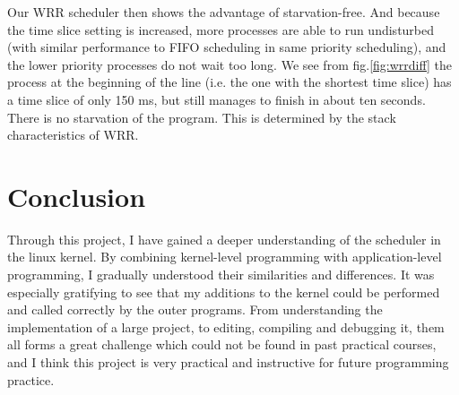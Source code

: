 \documentclass[11pt]{article}
\begin{document}
Our WRR scheduler then shows the advantage of starvation-free. And
because the time slice setting is increased, more processes are able to
run undisturbed (with similar performance to FIFO scheduling in same
priority scheduling), and the lower priority processes do not wait too
long. We see from fig.\ref{fig:wrrdiff} the process at the beginning of the line (i.e. the one with the
shortest time slice) has a time slice of only 150 ms, but still manages
to finish in about ten seconds. There is no starvation of the program.
This is determined by the stack characteristics of WRR.

\section{Conclusion}\label{conclusion}

Through this project, I have gained a deeper understanding of the
scheduler in the linux kernel. By combining kernel-level programming
with application-level programming, I gradually understood their
similarities and differences. It was especially gratifying to see that
my additions to the kernel could be performed and called correctly by
the outer programs. From understanding the implementation of a large
project, to editing, compiling and debugging it, them all forms a great
challenge which could not be found in past practical courses, and I
think this project is very practical and instructive for future
programming practice.
\end{document}
